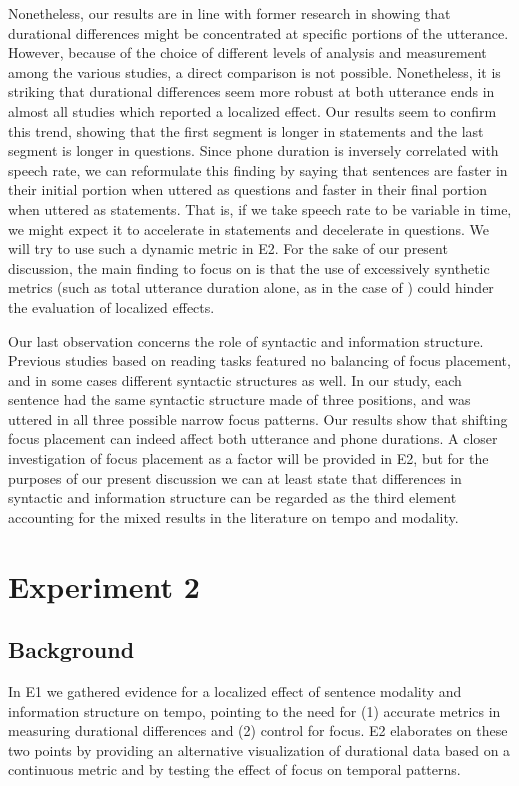 Nonetheless, our results are in line with former research in showing that durational differences might be concentrated at specific portions of the utterance. However, because of the choice of different levels of analysis and measurement among the various studies, a direct comparison is not possible. Nonetheless, it is  striking that durational differences seem more robust at both utterance ends in almost all studies which reported a localized effect. Our results seem to confirm this trend, showing that the first segment is longer in statements and the last segment is longer in questions. Since phone duration is inversely correlated with speech rate, we can reformulate this finding by saying that sentences are faster in their initial portion when uttered as questions and faster in their final portion when uttered as statements. That is, if we take speech rate to be variable in time, we might expect it to accelerate in statements and decelerate in questions. We will try to use such a dynamic metric in E2. For the sake of our present discussion, the main finding to focus on is that the use of excessively synthetic metrics (such as total utterance duration alone, as in the case of \citealt{maturi1988intonazione}) could hinder the evaluation of localized effects.

Our last observation concerns the role of syntactic and information structure. Previous studies based on reading tasks featured no balancing of focus placement, and in some cases different syntactic structures as well. In our study, each sentence had the same syntactic structure made of three positions, and was uttered in all three possible narrow focus patterns. Our results show that shifting focus placement can indeed affect both utterance and phone durations. A closer investigation of focus placement as a factor will be provided in E2, but for the purposes of our present discussion we can at least state that differences in syntactic and information structure can be regarded as the third element accounting for the mixed results in the literature on tempo and modality.

\section{Experiment 2}\label{sec44}
\subsection{Background}\label{sec440}
In E1 we gathered evidence for a localized effect of sentence modality and information structure on tempo, pointing to the need for (1) accurate metrics in measuring durational differences and (2) control for focus. E2 elaborates on these two points by providing an alternative visualization of durational data based on a continuous metric and by testing the effect of focus on temporal patterns.


